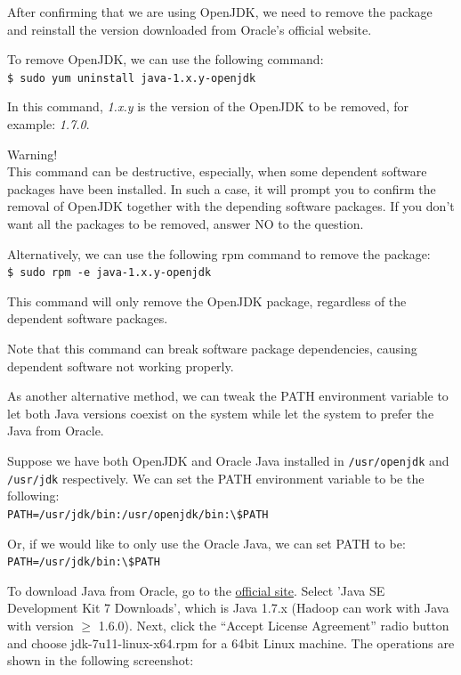After confirming that we are using OpenJDK, we need to remove the package and reinstall the version downloaded from Oracle's official website.

To remove OpenJDK, we can use the following command: \\
\verb|$ sudo yum uninstall java-1.x.y-openjdk|

In this command, \emph{1.x.y} is the version of the OpenJDK to be removed, for example: \emph{1.7.0}.

\begin{warning}
Warning! \\
This command can be destructive, especially, when some dependent software packages have been installed. In such a case, it will prompt you to confirm the removal of OpenJDK together with the depending software packages. If you don't want all the packages to be removed, answer NO to the question.
\end{warning}

Alternatively, we can use the following rpm command to remove the package:\\
\verb|$ sudo rpm -e java-1.x.y-openjdk|

This command will only remove the OpenJDK package, regardless of the dependent software packages.

Note that this command can break software package dependencies, causing dependent software not working properly.

As another alternative method, we can tweak the PATH environment variable to let both Java versions coexist on the system while let the system to prefer the Java from Oracle.

Suppose we have both OpenJDK and Oracle Java installed in \verb|/usr/openjdk| and \verb|/usr/jdk| respectively. We can set the PATH environment variable to be the following: \\
\verb|PATH=/usr/jdk/bin:/usr/openjdk/bin:\$PATH|

Or, if we would like to only use the Oracle Java, we can set PATH to be: \\
\verb|PATH=/usr/jdk/bin:\$PATH|

To download Java from Oracle, go to the \href{http://www.oracle.com/technetwork/java/javase/downloads/index.html}{official site}. Select 'Java SE Development Kit 7 Downloads', which is Java 1.7.x (Hadoop can work with Java with version $\ge$ 1.6.0). Next, click the ``Accept License Agreement'' radio button and choose jdk-7u11-linux-x64.rpm for a 64bit Linux machine. The operations are shown in the following screenshot:

